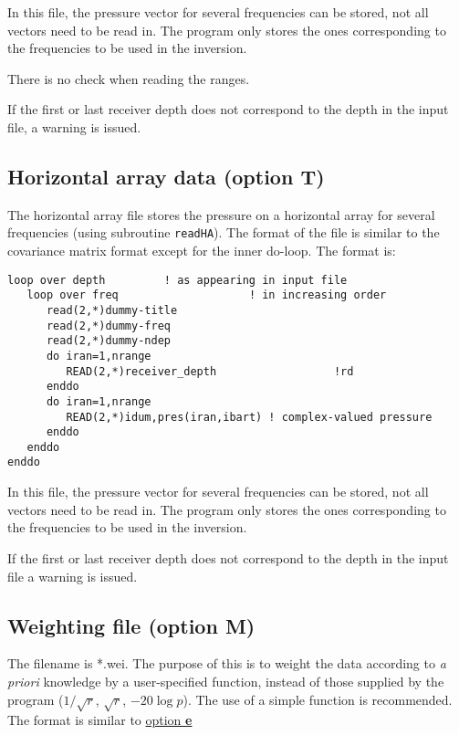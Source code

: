 \documentclass{saclantc}
\begin{document}
In this file, the pressure vector for several frequencies can be stored,
not all vectors need to be read in.  The program only
stores  the ones corresponding to the frequencies to be used in the
inversion.

There is no check when reading the ranges. 

If the first or last receiver depth does not correspond to the
depth in the input file, a warning is issued.
\subsection{Horizontal array data (option T)}
\label{se:opt_T}
The   horizontal array file stores  
the pressure on a horizontal array for several  frequencies 
(using subroutine {\tt readHA}).
The format of the file is similar to the 
covariance matrix format except for the inner do-loop.
The format is:

\small
\begin{verbatim} 
loop over depth         ! as appearing in input file
   loop over freq                    ! in increasing order
      read(2,*)dummy-title
      read(2,*)dummy-freq 
      read(2,*)dummy-ndep
      do iran=1,nrange
         READ(2,*)receiver_depth                  !rd
      enddo
      do iran=1,nrange
         READ(2,*)idum,pres(iran,ibart) ! complex-valued pressure
      enddo
   enddo
enddo
\end{verbatim}
\normalsize
 
In this file, the pressure vector for several frequencies can be stored,
not all vectors need to be read in.  The program only
stores  the ones corresponding to the frequencies to be used in the
inversion.


If the first or last receiver depth does not correspond to the
depth in the input file a warning is issued.


\subsection{Weighting file (option M)}
\label{se:opt_M}

The filename is *.wei.
The purpose of this is to weight the data according to {\it a priori}
knowledge by a user-specified function, instead of those supplied by the
program ($1/\sqrt{r}$, $\sqrt{r}$, $-20 \log{p}$).
The use of a simple function is recommended.
The format is similar to  \underline{option {\bf e}}
\end{document}
